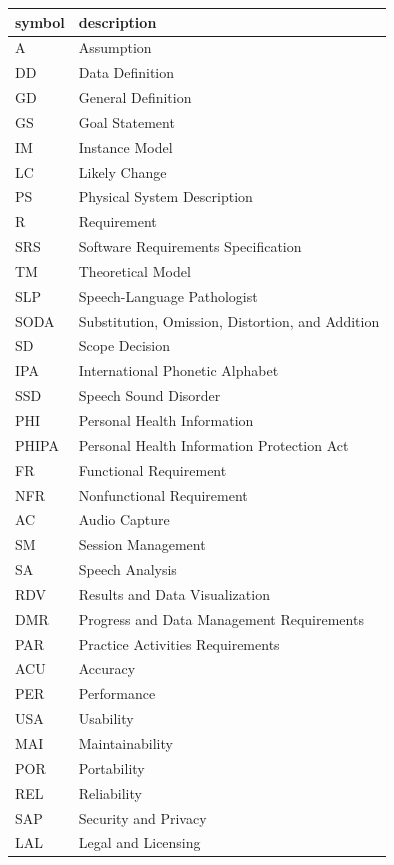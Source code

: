 \documentclass[12pt]{article}
\begin{document}
\renewcommand{\arraystretch}{1.2}
\begin{tabular}{l l} 
  \toprule		
  \textbf{symbol} & \textbf{description}\\
  \midrule 
  A & Assumption\\
  DD & Data Definition\\
  GD & General Definition\\
  GS & Goal Statement\\
  IM & Instance Model\\
  LC & Likely Change\\
  PS & Physical System Description\\
  R & Requirement\\
  SRS & Software Requirements Specification\\
  TM & Theoretical Model\\
  SLP & Speech-Language Pathologist \\
  SODA & Substitution, Omission, Distortion, and Addition \\
  SD & Scope Decision \\
  IPA & International Phonetic Alphabet \\
  SSD & Speech Sound Disorder \\
  PHI & Personal Health Information \\
  PHIPA & Personal Health Information Protection Act \\
  FR & Functional Requirement \\
  NFR & Nonfunctional Requirement \\
  AC & Audio Capture \\
  SM & Session Management \\
  SA & Speech Analysis \\
  RDV & Results and Data Visualization \\
  DMR & Progress and Data Management Requirements\\
  PAR & Practice Activities Requirements \\
  ACU & Accuracy \\
  PER & Performance \\
  USA & Usability \\
  MAI & Maintainability \\
  POR & Portability \\
  REL & Reliability \\
  SAP & Security and Privacy \\
  LAL & Legal and Licensing \\
  \bottomrule
\end{tabular}\\
\end{document}
